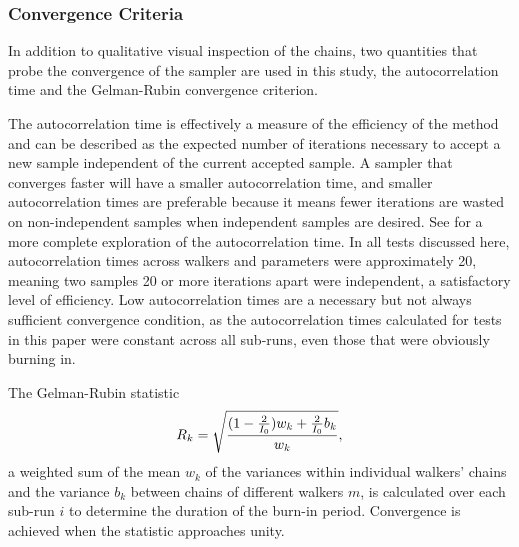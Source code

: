 \subsubsection{Convergence Criteria}

In addition to qualitative visual inspection of the chains, two quantities that probe the convergence of the sampler are used in this study, the autocorrelation time and the Gelman-Rubin convergence criterion.  


The autocorrelation time is effectively a measure of the efficiency of the method and can be described as the expected number of iterations necessary to accept a new sample independent of the current accepted sample.  
A sampler that converges faster will have a smaller autocorrelation time, and smaller autocorrelation times are preferable because it means fewer iterations are wasted on non-independent samples when independent samples are desired.  
See \citet{Foreman-Mackey2013} for a more complete exploration of the autocorrelation time.  
In all tests discussed here, autocorrelation times across walkers and parameters were approximately 20, meaning two samples 20 or more iterations apart were independent, a satisfactory level of efficiency.  
Low autocorrelation times are a necessary but not always sufficient convergence condition, as the autocorrelation times calculated for tests in this paper were constant across all sub-runs, even those that were obviously burning in.  

The Gelman-Rubin statistic
\begin{equation}
\eqlabel{eq:gr}
R_{k} = \sqrt{\frac{(1-\frac{2}{I_{0}})w_{k}+\frac{2}{I_{0}}b_{k}}{w_{k}}},
\end{equation}
a weighted sum of the mean $w_{k}$ of the variances within individual walkers' chains and the variance $b_{k}$ between chains of different walkers $m$, is calculated over each sub-run $i$ to determine the duration of the burn-in period.  
Convergence is achieved when the statistic approaches unity.  

